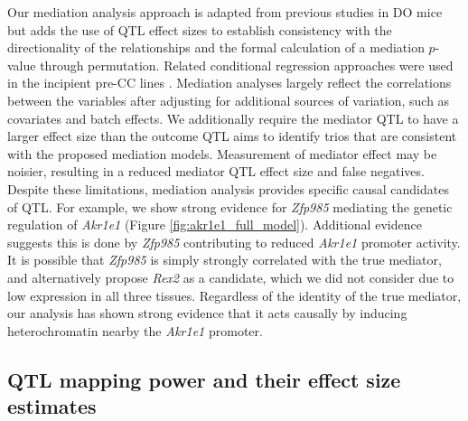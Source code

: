\documentclass[9pt,twocolumn,twoside]{gsajnl}
\begin{document}
Our mediation analysis approach is adapted from previous studies in DO mice \citep{Chick2016,Keller2018,Skelly2019} but adds the use of QTL effect sizes to establish consistency with the directionality of the relationships and the formal calculation of a mediation $p$-value through permutation.  Related conditional regression approaches were used in the incipient pre-CC lines \citep{Rutledge2014, Kelada2014}.
%
Mediation analyses largely reflect the correlations between the variables after adjusting for additional sources of variation, such as covariates and batch effects. We additionally require the mediator QTL to have a larger effect size than the outcome QTL aims to identify trios that are consistent with the proposed mediation models. Measurement of mediator effect may be noisier, resulting in a reduced mediator QTL effect size and false negatives. 
Despite these limitations, mediation analysis provides specific causal candidates of QTL. For example, we show strong evidence for \textit{Zfp985} mediating the genetic regulation of \textit{Akr1e1} (Figure \ref{fig:akr1e1_full_model}). Additional evidence suggests this is done by \textit{Zfp985} contributing to reduced \textit{Akr1e1} promoter activity. It is possible that \textit{Zfp985} is simply strongly correlated with the true mediator, and \cite{HamiltonWilliams2013} alternatively propose \textit{Rex2} as a candidate, which we did not consider due to low expression in all three tissues. Regardless of the identity of the true mediator, our analysis has shown strong evidence that it acts causally by inducing heterochromatin nearby the \textit{Akr1e1} promoter.

\subsection{QTL mapping power and their effect size estimates}
\end{document}
